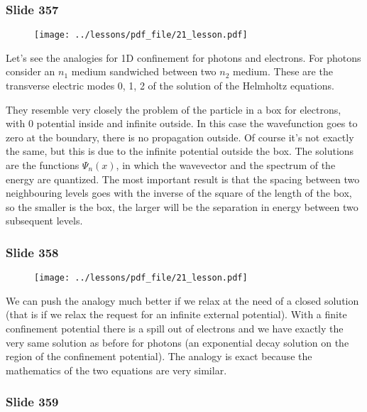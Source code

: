 \documentclass[../main/main.tex]{subfiles}
\begin{document}
\subsubsection{Slide 357}

\begin{figure}[h!]
\centering
\texttt{[image: ../lessons/pdf\_file/21\_lesson.pdf]}
\end{figure}


Let's see the analogies for 1D confinement for photons and electrons.
For photons consider an $n_1$ medium sandwiched between two $n_2$ medium. These are the transverse electric modes 0, 1, 2 of the solution of the Helmholtz equations. 

They resemble very closely the problem of the particle in a box for electrons, with 0 potential inside and infinite outside. In this case the wavefunction goes to zero at the boundary, there is no propagation outside.
Of course it's not exactly the same, but this is due to the infinite potential outside the box.
The solutions are the functions $\Psi_n(x)$, in which the wavevector and the spectrum of the energy are quantized. The most important result is that the spacing between two neighbouring levels goes with the inverse of the square of the length of the box, so the smaller is the box, the larger will be the separation in energy between two subsequent levels.


\newpage

\subsubsection{Slide 358}

\begin{figure}[h!]
\centering
\texttt{[image: ../lessons/pdf\_file/21\_lesson.pdf]}
\end{figure}

We can push the analogy much better if we relax at the need of a closed solution (that is if we relax the request for an infinite external potential). With a finite confinement potential there is a spill out of electrons and we have exactly the very same solution as before for photons (an exponential decay solution on the region of the confinement potential).
The analogy is exact because the mathematics of the two equations are very similar.

\newpage

\subsubsection{Slide 359}
\end{document}
